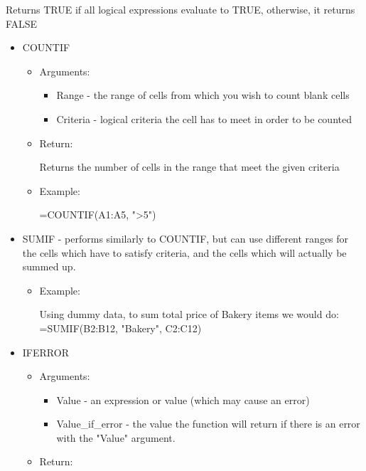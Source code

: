 \documentclass[8pt]{extarticle}
\begin{document}
\begin{multicols}{3}
\begin{itemize}
\begin{itemize}
        Returns TRUE if all logical expressions evaluate to TRUE, otherwise, it returns FALSE
    \end{itemize}
\end{itemize}

\begin{itemize}
    \item COUNTIF
    \begin{itemize}
        \item Arguments:
        \begin{itemize}
            \item Range - the range of cells from which you wish to count blank cells
            \item Criteria - logical criteria the cell has to meet in order to be counted
        \end{itemize}
        \item Return:

        Returns the number of cells in the range that meet the given criteria
        \item Example:

        =COUNTIF(A1:A5, ">5")
    \end{itemize}
\end{itemize}

\begin{itemize}
    \item SUMIF - performs similarly to COUNTIF, but can use different ranges for the cells which have to satisfy criteria, and the cells which will actually be summed up. 
    \begin{itemize}
    \item Example: 

    Using dummy data, to sum total price of Bakery items we would do: =SUMIF(B2:B12, "Bakery", C2:C12)
    \end{itemize}
\end{itemize}

\begin{itemize}
    \item IFERROR
    \begin{itemize}
        \item Arguments:
        \begin{itemize}
            \item Value - an expression or value (which may cause an error)
            \item Value\_if\_error - the value the function will return if there is an error with the "Value" argument.
        \end{itemize}
        \item Return:


\end{itemize}
\end{itemize}
\end{multicols}
\end{document}
